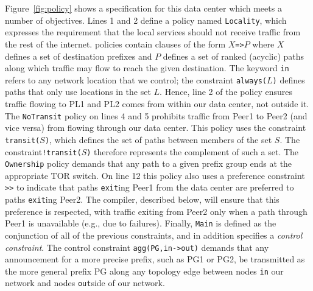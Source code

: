 Figure~\ref{fig:policy} shows a \Propane specification for this data center which meets a number of objectives.  Lines 1 and 2 define a policy named \texttt{Locality}, which expresses the requirement that
the local services should not receive traffic from the rest of the internet.  
\Propane policies contain clauses of the form
\texttt{$X$=>$P$} where $X$ defines a set of destination prefixes and 
$P$ defines a set of ranked (acyclic) paths along which traffic may flow 
to reach the given destination.  The keyword \texttt{in} refers to
any network location that we control; the constraint \texttt{always($L$)}
defines paths that only use locations in the set $L$.  Hence, line 2
of the policy ensures traffic flowing to PL1 and PL2 comes from within
our data center, not outside it.  The \texttt{NoTransit} policy on lines 4 and 5 prohibits traffic from Peer1 to Peer2 (and vice versa) from flowing through our data center.  This policy uses the constraint 
\texttt{transit($S$)}, which defines the set of paths between members of the set $S$.
The constraint\texttt{!transit($S$)} therefore represents the complement of such a set.
The \texttt{Ownership} policy demands that any path
to a given prefix group ends at the appropriate TOR switch.  On line 12 this policy also uses a preference constraint \texttt{>>} to indicate that paths \texttt{exit}ing Peer1 from the data center are preferred to paths \texttt{exit}ing Peer2.  The \Propane compiler, described below, will ensure that this preference is respected, with traffic exiting from Peer2 only when a path through Peer1 is unavailable (e.g., due to failures).  Finally,
\texttt{Main} is defined as the conjunction of all of the previous constraints,
and in addition specifies a \emph{control constraint}.  The control
constraint \texttt{agg(PG,in->out)} demands that any announcement
for a more precise prefix, such as PG1 or PG2, be transmitted as the
more general prefix PG along any topology edge between nodes \texttt{in}
our network and nodes \texttt{out}side of our network.

